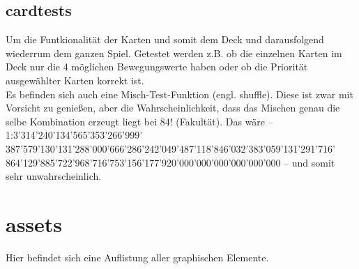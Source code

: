 \documentclass[12pt,a4paper,oneside]{book}
\theoremstyle{plain}
\numberwithin{equation}{chapter} \DeclareMathOperator{\Var}{Var}
\begin{document}
\section{cardtests}
    Um die Funtkionalität der Karten und somit dem Deck und darausfolgend wiederrum dem ganzen Spiel. Getestet werden z.B. ob die einzelnen Karten im Deck nur die 4 möglichen Bewegungswerte haben oder ob die Priorität ausgewählter Karten korrekt ist. \\
    Es befinden sich auch eine Misch-Test-Funktion (engl. shuffle). Diese ist zwar mit Vorsicht zu genießen, aber die Wahrscheinlichkeit, dass das Mischen genau die selbe Kombination erzeugt liegt bei 84! (Fakultät). Das wäre -- 1:3'314'240'134'565'353'266'999' 387'579'130'131'288'000'666'286'242'049'487'118'846'032'383'059'131'291'716' 864'129'885'722'968'716'753'156'177'920'000'000'000'000'000'000 -- und somit \\ sehr unwahrscheinlich.

\chapter{assets}
    Hier befindet sich eine Auflistung aller graphischen Elemente.
\end{document}
